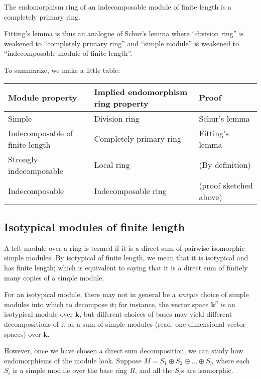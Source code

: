 \documentclass[a4paper]{amsart}
\newcommand{\field}{\mathbf{k}}
\begin{document}
\begin{theorem}
  The endomorphism ring of an indecomposable module of finite length
  is a completely primary ring.
\end{theorem}

Fitting's lemma is thus an analogue of Schur's lemma where ``division
ring'' is weakened to ``completely primary ring'' and ``simple module''
is weakened to ``indecomposable module of finite length''.

To summarize, we make a little table:

\begin{tabular}{|l|l|l|}
  \hline
  Module property & Implied endomorphism ring property & Proof\\
  \hline
  Simple & Division ring & Schur's lemma\\
  Indecomposable of finite length & Completely primary ring & Fitting's lemma\\
  Strongly indecomposable & Local ring & (By definition)\\
  Indecomposable & Indecomposable ring & (proof sketched above)\\
  \hline
\end{tabular}

\subsection{Isotypical modules of finite length}

\begin{definer}
  A left module over a ring is termed
   if it is a direct sum of
  pairwise isomorphic simple modules. By isotypical of finite length,
  we mean that it is isotypical and has finite length; which is
  equivalent to saying that it is a direct sum of finitely many copies
  of a simple module.
\end{definer}

For an isotypical module, there may not in general be a {\em unique}
choice of simple modules into which to decompose it; for instance, the
vector space $\field^n$ is an isotypical module over $\field$, but
different choices of bases may yield different decompositions of it as
a sum of simple modules (read: one-dimensional vector spaces) over
$\field$.

However, once we have chosen a direct sum decomposition, we can study
how endomorphisms of the module look. Suppose $M = S_1 \oplus S_2
\oplus \ldots \oplus S_n$ where each $S_i$ is a simple module over the
base ring $R$, and all the $S_i$s are isomorphic.
\end{document}
